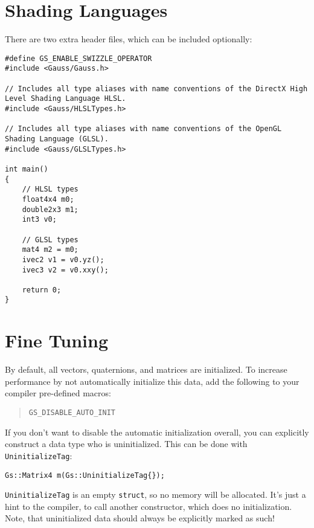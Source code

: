 \documentclass{article}
\begin{document}

\section*{Shading Languages}

There are two extra header files, which can be included optionally:
\begin{lstlisting}
#define GS_ENABLE_SWIZZLE_OPERATOR
#include <Gauss/Gauss.h>

// Includes all type aliases with name conventions of the DirectX High Level Shading Language HLSL.
#include <Gauss/HLSLTypes.h>

// Includes all type aliases with name conventions of the OpenGL Shading Language (GLSL).
#include <Gauss/GLSLTypes.h>

int main()
{
	// HLSL types
	float4x4 m0;
	double2x3 m1;
	int3 v0;
	
	// GLSL types
	mat4 m2 = m0;
	ivec2 v1 = v0.yz();
	ivec3 v2 = v0.xxy();
	
	return 0;
}
\end{lstlisting}



\section*{Fine Tuning}

By default, all vectors, quaternions, and matrices are initialized. To increase performance by not automatically
initialize this data, add the following to your compiler pre-defined macros:
\begin{quote}
\texttt{GS\_DISABLE\_AUTO\_INIT}
\end{quote}
If you don't want to disable the automatic initialization overall, you can explicitly construct a data type
who is uninitialized. This can be done with \texttt{UninitializeTag}:
\begin{lstlisting}
Gs::Matrix4 m(Gs::UninitializeTag{});
\end{lstlisting}
\texttt{UninitializeTag} is an empty \texttt{struct}, so no memory will be allocated. It's just a hint to the compiler,
to call another constructor, which does no initialization.
Note, that uninitialized data should always be explicitly marked as such!
\end{document}
